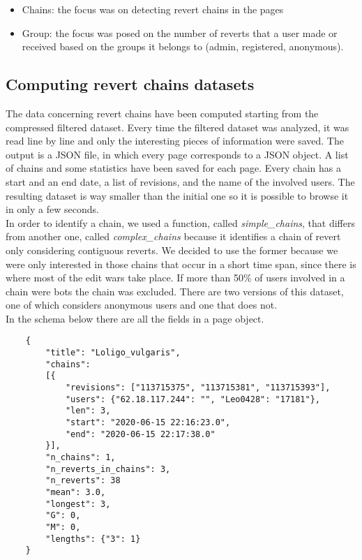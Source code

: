 \begin{itemize}
    \item Chains:  the focus was on detecting revert chains in the pages 
    \item Group:  the focus was posed on the number of reverts that a user made or received based on the groups it belongs to (admin, registered, anonymous).
\end{itemize}

\subsection{Computing revert chains datasets}
The data concerning revert chains have been computed starting from the compressed filtered dataset. Every
time the filtered dataset was analyzed, it was read line by line and only the interesting
pieces of information were saved. The output is a JSON file, in which every page corresponds to a JSON object.
A list of chains and some statistics have been saved for each page. Every chain has a start and an end date, a
list of revisions, and the name of the involved users. The resulting dataset is way smaller than the initial one so it is
possible to browse it in only a few seconds.\\


In order to identify a chain, we used a function, called \textit{simple\_chains}, that differs from
another one, called \textit{complex\_chains} because it identifies a chain of revert only
considering contiguous reverts. We decided to use the former because we were only interested in
those chains that occur in a short time span, since there is where most of the edit wars take place.
If more than 50\% of users involved in a chain were bots the chain was excluded. There are two
versions of this dataset, one of which considers anonymous users and one that does not. \\

In the schema below there are all the fields in a page object. 
\begin{verbatim}
    {
        "title": "Loligo_vulgaris", 
        "chains": 
        [{
            "revisions": ["113715375", "113715381", "113715393"], 
            "users": {"62.18.117.244": "", "Leo0428": "17181"}, 
            "len": 3, 
            "start": "2020-06-15 22:16:23.0", 
            "end": "2020-06-15 22:17:38.0"
        }], 
        "n_chains": 1, 
        "n_reverts_in_chains": 3, 
        "n_reverts": 38
        "mean": 3.0, 
        "longest": 3, 
        "G": 0,
        "M": 0, 
        "lengths": {"3": 1}
    }
    
\end{verbatim}



